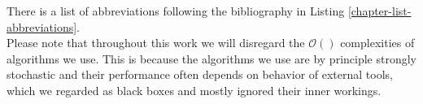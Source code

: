 There is a list of abbreviations following the bibliography in Listing \ref{chapter-list-abbreviations}.\\

Please note that throughout this work we will disregard the $\mathcal{O}()$ complexities of algorithms we use. This is because the algorithms we use are by principle strongly stochastic and their performance often depends on behavior of external tools, which we regarded as black boxes and mostly ignored their inner workings.